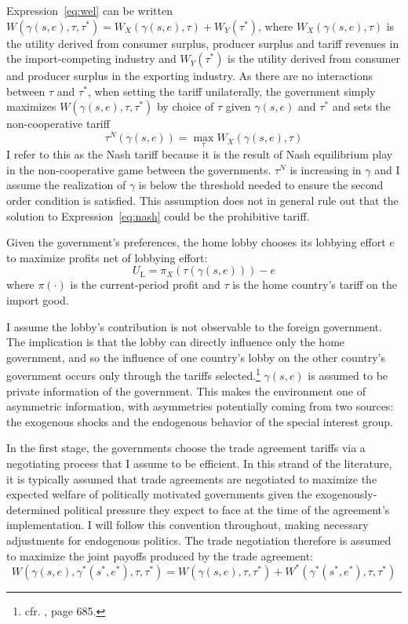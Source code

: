 \documentclass[12pt,titlepage]{article}
\newcommand{\ga}{\gamma}
\begin{document}
Expression~\ref{eq:wel} can be written $W(\ga(s,e),\tau,\tau^*) = W_X(\ga(s,e),\tau) +W_Y(\tau^*)$, where $W_X(\ga(s,e),\tau)$ is the utility derived from consumer surplus, producer surplus and tariff revenues in the import-competing industry and $W_Y(\tau^*)$ is the utility derived from consumer and producer surplus in the exporting industry. As there are no interactions between $\tau$ and $\tau^*$, when setting the tariff unilaterally, the government simply maximizes $W(\ga(s,e),\tau, \tau^*)$ by choice of $\tau$ given $\ga(s,e)$ and $\tau^*$ and sets the non-cooperative tariff
\begin{equation}
  \tau^N(\ga(s,e)) = \max_\tau W_X(\ga(s,e),\tau)
  \label{eq:nash}
\end{equation}
I refer to this as the Nash tariff because it is the result of Nash equilibrium play in the non-cooperative game between the governments. $\tau^N$ is increasing in $\ga$ and I assume the realization of $\ga$ is below the threshold needed to ensure the second order condition is satisfied. This assumption does not in general rule out that the solution to Expression~\ref{eq:nash} could be the prohibitive tariff.

Given the government's preferences, the home lobby chooses its lobbying effort $e$ to maximize profits net of lobbying effort:
\begin{equation}
  U_\text{L} = \pi_X(\tau(\ga(s,e))) - e
  \label{eq:lv3}
\end{equation}
where $\pi(\cdot)$ is the current-period profit and $\tau$ is the home country's tariff on the import good. %

I assume the lobby's contribution is not observable to the foreign government. The implication is that the lobby can directly influence only the home government, and so the influence of one country's lobby on the other country's government occurs only through the tariffs selected.\footnote{cfr. \Textcite{gh95}, page 685.} $\ga(s,e)$ is assumed to be private information of the government. This makes the environment one of asymmetric information, with asymmetries potentially coming from two sources: the exogenous shocks and the endogenous behavior of the special interest group.

In the first stage, the governments choose the trade agreement tariffs via a negotiating process that I assume to be efficient. In this strand of the literature, it is typically assumed that trade agreements are negotiated to maximize the expected welfare of politically motivated governments given the exogenously-determined political pressure they expect to face at the time of the agreement's implementation. I will follow this convention throughout, making necessary adjustments for endogenous politics. The trade negotiation therefore is assumed to maximize the joint payoffs produced by the trade agreement:
\begin{equation}
  W(\ga(s,e),\ga^*(s^*,e^*),\tau,\tau^*) = W(\ga(s,e),\tau,\tau^*) + W^*(\ga^*(s^*,e^*),\tau,\tau^*)
  \label{eq:jv}
\end{equation}
\end{document}
